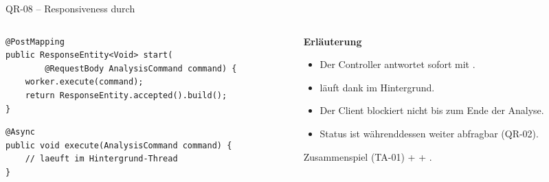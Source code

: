\begin{frame}[fragile]{QR-08 -- Responsiveness durch }
  \begin{columns}[T,onlytextwidth]
    \begin{column}{0.5\textwidth}
      \begin{lstlisting}[style=java]
@PostMapping
public ResponseEntity<Void> start(
        @RequestBody AnalysisCommand command) {
    worker.execute(command);
    return ResponseEntity.accepted().build();
}
      \end{lstlisting}

      \vspace{0.1cm}
      \begin{lstlisting}[style=java]
@Async
public void execute(AnalysisCommand command) {
    // laeuft im Hintergrund-Thread
}
      \end{lstlisting}
    \end{column}
    \begin{column}{0.46\textwidth}
      \textbf{Erläuterung}
      \begin{itemize}
        \item Der Controller antwortet sofort mit .
        \item {} läuft dank  im Hintergrund.
        \item Der Client blockiert nicht bis zum Ende der Analyse.
        \item Status ist währenddessen weiter abfragbar (QR-02).
      \end{itemize}
      \begin{block}{Zusammenspiel}
        \small {} (TA-01) +  + .
      \end{block}
    \end{column}
  \end{columns}
\end{frame}

